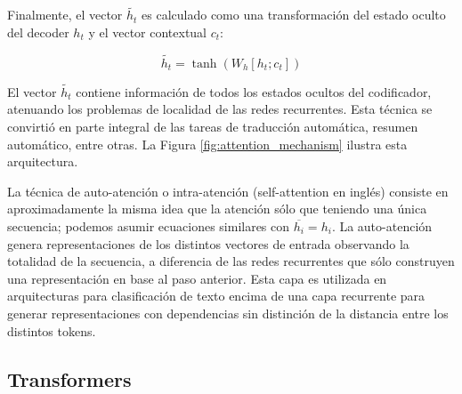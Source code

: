 Finalmente, el vector $\widetilde{h_t}$ es calculado como una transformación del estado oculto del decoder $h_t$ y el vector contextual $c_t$:


\begin{equation*}
    \widetilde{h_t} = \tanh(W_h [h_t; c_t])
\end{equation*}


El vector $\widetilde{h_t}$ contiene información de todos los estados ocultos del codificador, atenuando los problemas de localidad de las redes recurrentes. Esta técnica se convirtió en parte integral de las tareas de traducción automática, resumen automático, entre otras. La Figura \ref{fig:attention_mechanism} ilustra esta arquitectura.

La técnica de auto-atención o intra-atención \cite{parikh-etal-2016-decomposable} (self-attention en inglés) consiste en aproximadamente la misma idea que la atención sólo que teniendo una única secuencia; podemos asumir ecuaciones similares con $\overline{h_i} = h_i$. La auto-atención genera representaciones de los distintos vectores de entrada observando la totalidad de la secuencia, a diferencia de las redes recurrentes que sólo construyen una representación en base al paso anterior. Esta capa es utilizada en arquitecturas para clasificación de texto encima de una capa recurrente para generar representaciones con dependencias sin distinción de la distancia entre los distintos tokens.

\subsection{Transformers}

